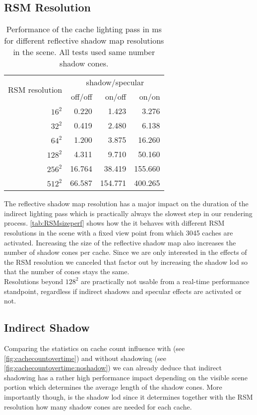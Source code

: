 \documentclass[thesis.tex]{subfiles}
\begin{document}
\subsection{RSM Resolution}
\begin{table}[h]
  \centering
    \begin{tabular}{r|rrr}
    \toprule
    \multirow{2}{*}{RSM resolution} & \multicolumn{3}{c}{ shadow/specular}\\
     & off/off & on/off & on/on \\
    \midrule
    $16^2$    & 0.220 & 1.423 & 3.276 \\
    $32^2$    & 0.419 & 2.480 & 6.138 \\
    $64^2$    & 1.200 & 3.875 & 16.260 \\
    $128^2$   & 4.311 & 9.710 & 50.160 \\
    $256^2$   & 16.764 & 38.419 & 155.660 \\
    $512^2$   & 66.587 & 154.771 & 400.265 \\
    \bottomrule
    \end{tabular}
\caption{Performance of the cache lighting pass in \si{\milli\second} for different reflective shadow map resolutions in the  scene. All tests used same number shadow cones. }
\label{tab:RSMsizeperf}
\end{table}
The reflective shadow map resolution has a major impact on the duration of the indirect lighting pass which is practically always the slowest step in our rendering process.
\autoref{tab:RSMsizeperf} shows how the it behaves with different RSM resolutions in the  scene with a fixed view point from which 3045 caches are activated. %
Increasing the size of the reflective shadow map also increases the number of shadow cones per cache.
Since we are only interested in the effects of the RSM resolution we canceled that factor out by increasing the shadow lod so that the number of cones stays the same.
\\
Resolutions beyond $128^2$ are practically not usable from a real-time performance standpoint, regardless if indirect shadows and specular effects are activated or not.

\subsection{Indirect Shadow}
Comparing the statistics on cache count influence with (see \autoref{fig:cachecountovertime}) and without shadowing (see \autoref{fig:cachecountovertime:noshadow}) we can already deduce that indirect shadowing has a rather high performance impact depending on the visible scene portion which determines the average length of the shadow cones.
More importantly though, is the shadow lod since it determines together with the RSM resolution how many shadow cones are needed for each cache.
\end{document}
